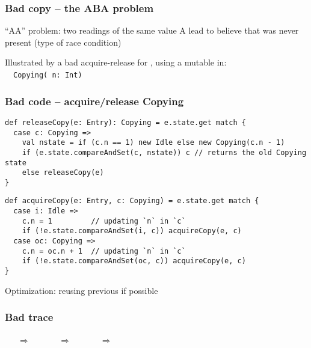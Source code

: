 \documentclass[aspectratio=169]{beamer}
\begin{document}
\begin{frame}\frametitle{Bad copy -- the ABA problem}
\alert{``AA'' problem}: two readings of the same value \alert{A} lead to believe that  was never present (type of race condition)

\bigskip

Illustrated by a bad acquire-release for , using a mutable  in:
\\~~\alert{\texttt{Copying( n: Int)}}
\end{frame}


\begin{frame}[fragile]\frametitle{Bad code -- acquire/release Copying}
\label{slide:badcopy}
    
\begin{lstlisting}[emph={execute,sleep,log,logMessage,compareAndSet,releaseCopy}]
def releaseCopy(e: Entry): Copying = e.state.get match {
  case c: Copying =>
    val nstate = if (c.n == 1) new Idle else new Copying(c.n - 1)
    if (e.state.compareAndSet(c, nstate)) c // returns the old Copying state
    else releaseCopy(e)
}
\end{lstlisting}
\begin{lstlisting}[emph={execute,sleep,log,logMessage,compareAndSet,acquireCopy}]
def acquireCopy(e: Entry, c: Copying) = e.state.get match {
  case i: Idle =>
    c.n = 1         // updating `n` in `c`
    if (!e.state.compareAndSet(i, c)) acquireCopy(e, c)
  case oc: Copying =>
    c.n = oc.n + 1  // updating `n` in `c`
    if (!e.state.compareAndSet(oc, c)) acquireCopy(e, c)
}
\end{lstlisting}
Optimization: reusing previous  if possible
\end{frame}


\begin{frame}\frametitle{Bad trace}

    \begin{block}{
      ~~~$\Rightarrow$~~~
      ~~~$\Rightarrow$~~~
      ~~~$\Rightarrow$~~~
      }
    \end{block}
\end{frame}
\end{document}
